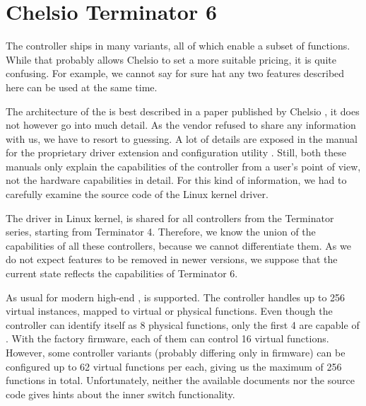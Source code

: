 \section{Chelsio Terminator 6}

% 
% 
% 
% 
% 
% 
% 
% 
% 
% 

The controller ships in many variants, all of which enable a subset of
functions. While that probably allows Chelsio to set a more suitable pricing,
it is quite confusing. For example, we cannot say for sure hat any two features
described here can be used at the same time.

The architecture of the  is best described in a paper published by
Chelsio \cite{chelsio-t6}, it does not however go into much detail. As the
vendor refused to share any information with us, we have to resort to guessing.
A lot of details are exposed in the manual for the proprietary driver extension
and configuration utility \cite{chelsio-uw}. Still, both these manuals only
explain the capabilities of the controller from a user's point of view, not the
hardware capabilities in detail. For this kind of information, we had to
carefully examine the source code of the Linux kernel driver.

The driver in Linux kernel,  is shared for all controllers from the
Terminator series, starting from Terminator 4. Therefore, we know the union of
the capabilities of all these controllers, because we cannot differentiate
them. As we do not expect features to be removed in newer versions, we suppose
that the current state reflects the capabilities of Terminator 6.

As usual for modern high-end ,  is supported. The controller handles up
to 256 virtual instances, mapped to virtual or physical functions. Even though
the controller can identify itself as 8 physical functions, only the first
4 are capable of . With the factory firmware, each of them can
control 16 virtual functions. However, some controller variants (probably
differing only in firmware) can be configured up to 62 virtual functions per
each, giving us the maximum of 256 functions in total. Unfortunately, neither
the available documents nor the source code gives hints about the inner switch
functionality.

